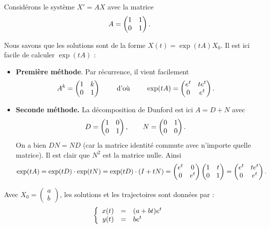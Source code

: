 \documentclass[12pt, class=report,crop=false]{standalone}
\begin{document}
\begin{exemple}
Considérons le système $X'=AX$ avec la matrice
$$A = \begin{pmatrix}1&1\cr 0&1\end{pmatrix}.$$

Nous savons que les solutions sont de la forme
$X(t) = \exp(tA) X_0$.
Il est ici facile de calculer $\exp(tA)$ :
\begin{itemize}
  \item \textbf{Première méthode}. Par récurrence, il vient facilement 
  $$A^k = \begin{pmatrix}1&k\cr 0&1\end{pmatrix}
  \qquad \text{ d'où } \qquad 
  \exp(tA) =  \begin{pmatrix}e^t& te^t\cr 0&e^t\end{pmatrix}.$$
  
  \item \textbf{Seconde méthode.} La décomposition de Dunford est ici
  $ A = D + N$ avec 
  $$D = \begin{pmatrix}1&0\cr 0&1\end{pmatrix}, \qquad
  N = \begin{pmatrix}0&1\cr 0&0\end{pmatrix}.$$
  On a bien $DN=ND$ (car la matrice identité commute avec n'importe quelle matrice).
  Il est clair que $N^2$ est la matrice nulle.
  Ainsi
  $$\exp(tA) = \exp(tD)\cdot \exp(tN) = \exp(tD) \cdot (I+tN)
  = \begin{pmatrix}e^t& 0\cr 0&e^t\end{pmatrix}
  \begin{pmatrix}1& t\cr 0&1\end{pmatrix}
  = \begin{pmatrix}e^t& te^t\cr 0&e^t\end{pmatrix}.$$
  
\end{itemize}

Avec $X_0 =  \left(\begin{smallmatrix}a\\b\end{smallmatrix} \right)$,
les solutions et les trajectoires sont données par :
$$\left\{\begin{array}{rcl}
x(t) &=& (a+bt)e^t\cr  
y(t) &=& be^{t}
\end{array}\right.$$


\end{exemple}
\end{document}
